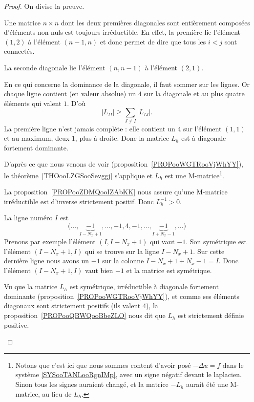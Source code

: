 \begin{proof}
	On divise la preuve.
	\begin{subproof}
		\spitem[Irréductible]
		Une matrice \( n\times n\) dont les deux premières diagonales sont entièrement composées d'éléments non nuls est toujours irréductible. En effet, la première lie l'élément \( (1,2)\) à l'élément \( (n-1,n)\) et donc permet de dire que tous les \( i<j\) sont connectés.

		La seconde diagonale lie l'élément \( (n,n-1)\) à l'élément \( (2,1)\).

		En ce qui concerne la dominance de la diagonale, il faut sommer sur les lignes. Or chaque ligne contient (en valeur absolue) un \( 4\) sur la diagonale et au plus quatre éléments qui valent \( 1\). D'où
		\begin{equation}
			| L_{II} |\geq \sum_{J\neq I}| L_{IJ} |.
		\end{equation}
		La première ligne n'est jamais complète : elle contient un \( 4\) sur l'élément \( (1,1)\) et au maximum, deux \( 1\), plus à droite. Donc la matrice \( L_h\) est à diagonale fortement dominante.

		\spitem[M-matrice]
            
		D'après ce que nous venons de voir (proposition~\ref{PROPooWGTRooVjWhYY}), le théorème~\ref{THOooLZGSooSevggj} s'applique et \( L_h\) est une M-matrice\footnote{Notons que c'est ici que nous sommes content d'avoir posé \( -\Delta u=f\) dans le système \eqref{SYSooTANLooRgnIMp}, avec un signe négatif devant le laplacien. Sinon tous les signes auraient changé, et la matrice \( -L_h\) aurait été une M-matrice, au lieu de \( L_h\).}.

		La proposition~\ref{PROPooZDMQooIZAbKK} nous assure qu'une M-matrice irréductible est d'inverse strictement positif. Donc \( L_h^{-1}>0\).

		\spitem[Symétrique]
		La ligne numéro \( I\) est
		\begin{equation}
			\big( \ldots ,\underbrace{-1}_{I-N_x+1},\ldots,-1,4,-1,\ldots,\underbrace{-1}_{I+N_x-1},\ldots \big)
		\end{equation}
		Prenons par exemple l'élément \( (I,I-N_x+1)\) qui vaut \( -1\). Son symétrique est l'élément \( (I-N_x+1,I)\) qui se trouve sur la ligne \( I-N_x+1\). Sur cette dernière ligne nous avons un \( -1\) sur la colonne \( I-N_x+1+N_x-1=I\). Donc l'élément \( (I-N_x+1,I)\) vaut bien \( -1\) et la matrice est symétrique.

		Vu que la matrice \( L_h\) est symétrique, irréductible à diagonale fortement dominante (proposition~\ref{PROPooWGTRooVjWhYY}), et comme ses éléments diagonaux sont strictement positifs (ils valent \( 4\)), la proposition~\ref{PROPooQBWQooBbeZLO} nous dit que \( L_h\) est strictement définie positive.
	\end{subproof}
\end{proof}

